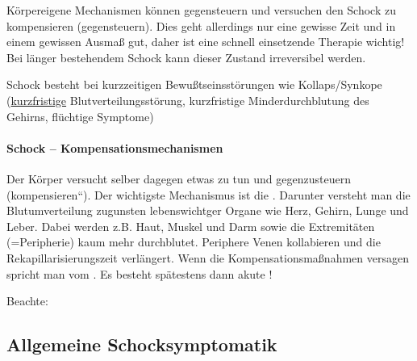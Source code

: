 
K\"orpereigene Mechanismen k\"onnen gegensteuern und versuchen den
Schock zu kompensieren (gegensteuern). Dies geht allerdings nur eine
gewisse Zeit und in einem gewissen Ausma{\ss} gut, daher ist eine
schnell  einsetzende Therapie wichtig! Bei l\"anger bestehendem Schock
kann dieser Zustand irreversibel werden. 

 Schock besteht bei kurzzeitigen 
Bewu{\ss}tseinsst\"orungen wie Kollaps/Synkope
(\underline{kurzfristige} Blutverteilungsst\"orung,
kurzfristige Minderdurchblutung des Gehirns,  fl\"uchtige Symptome)


\paragraph{Schock --  Kompensationsmechanismen}

Der K\"orper versucht selber dagegen etwas zu tun und gegenzusteuern
({\quotedblbase}kompensieren{\textquotedblleft}). Der wichtigste
Mechanismus ist die . Darunter versteht man die Blutumverteilung zugunsten lebenswichtger Organe wie
Herz, Gehirn, Lunge und Leber. Dabei werden z.B. Haut, Muskel und Darm
sowie die Extremit\"aten (=Peripherie) kaum mehr  durchblutet.
Periphere Venen kollabieren und die Rekapillarisierungszeit
verl\"angert. Wenn die Kompensationsma{\ss}nahmen  versagen spricht man
vom . Es besteht sp\"atestens dann akute
!

Beachte: 



\subsection{Allgemeine Schocksymptomatik}


